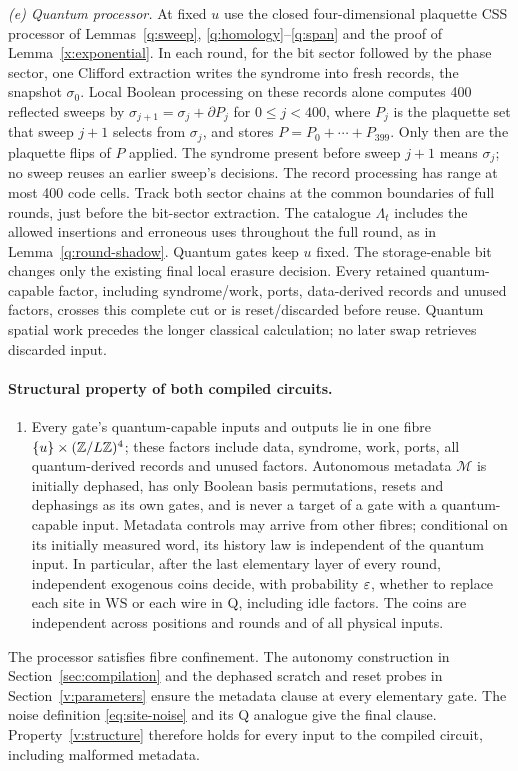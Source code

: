 \emph{(e) Quantum processor.} At fixed \(u\) use the closed four-dimensional plaquette CSS processor
of Lemmas~\ref{q:sweep}, \ref{q:homology}--\ref{q:span} and the proof of
Lemma~\ref{x:exponential}. In each round, for the bit sector followed by the phase sector, one
Clifford extraction writes the syndrome into fresh records, the snapshot
\(\sigma_0\). Local Boolean processing on these records alone computes
400 reflected sweeps by
\(\sigma_{j+1}=\sigma_j+\partial P_j\) for \(0\le j<400\), where
\(P_j\) is the plaquette set that sweep \(j+1\) selects from
\(\sigma_j\), and stores \(P=P_0+\cdots+P_{399}\). Only then are the
plaquette flips of \(P\) applied. The syndrome present before sweep
\(j+1\) means \(\sigma_j\); no sweep reuses an earlier sweep's decisions.
The record processing has range at most 400 code cells.
Track both sector chains at the common boundaries of full rounds,
just before the bit-sector extraction. The catalogue \(\Lambda_t\)
includes the allowed insertions and erroneous uses throughout the full
round, as in Lemma~\ref{q:round-shadow}.
Quantum
gates keep \(u\) fixed. The storage-enable bit changes only the existing final local
erasure decision. Every retained quantum-capable factor, including
syndrome/work, ports, data-derived records and unused factors, crosses
this complete cut or is reset/discarded before reuse. Quantum spatial
work precedes the longer classical calculation; no later swap retrieves
discarded input.

\paragraph{Structural property of both compiled circuits.}
\begin{enumerate}[label=\textup{(S)},ref=\textup{(S)}]
\item\label{v:structure} Every gate's quantum-capable inputs and
outputs lie in one fibre \(\{u\}\times(\mathbb Z/L\mathbb Z)^4\); these factors
include data, syndrome, work, ports, all quantum-derived records and
unused factors. Autonomous metadata \(\mathcal M\) is initially
dephased, has only Boolean basis permutations, resets and dephasings
as its own gates, and is never a target of a gate with a
quantum-capable input. Metadata controls may arrive from other
fibres; conditional on its initially measured word, its history law
is independent of the quantum input. In particular, after the last elementary
layer of every round, independent exogenous coins decide, with probability \(\varepsilon\), whether to replace each site in \(\mathrm{WS}\) or each wire in Q, including idle factors. The coins are independent across positions and rounds and of all physical inputs.
\end{enumerate}
The processor satisfies fibre confinement. The autonomy construction in Section~\ref{sec:compilation} and the dephased scratch and reset probes in Section~\ref{v:parameters} ensure the metadata clause at every elementary gate. The noise definition \eqref{eq:site-noise} and its Q analogue give the final clause. Property~\ref{v:structure} therefore holds for every input to the compiled circuit, including malformed metadata.






